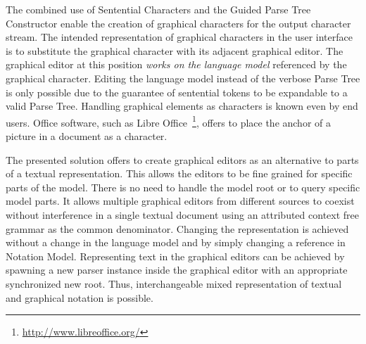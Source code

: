 The combined use of Sentential Characters and the Guided Parse Tree Constructor enable the creation of graphical characters for the output character stream. The intended representation of graphical characters in the user interface is to substitute the graphical character with its adjacent graphical editor. The graphical editor at this position \emph{works on the language model} referenced by the graphical character. Editing the language model instead of the verbose Parse Tree is only possible due to the guarantee of sentential tokens to be expandable to a valid Parse Tree. Handling graphical elements as characters is known even by end users. Office software, such as Libre Office~\footnote{\raggedright \url{http://www.libreoffice.org/}}, offers to place the anchor of a picture in a document as a character.

The presented solution offers to create graphical editors as an alternative to parts of a textual representation. This allows the editors to be fine grained for specific parts of the model. There is no need to handle the model root or to query specific model parts. It allows multiple graphical editors from different sources to coexist without interference in a single textual document using an attributed context free grammar as the common denominator. Changing the representation is achieved without a change in the language model and by simply changing a reference in Notation Model. Representing text in the graphical editors can be achieved by spawning a new parser instance inside the graphical editor with an appropriate synchronized new root. Thus, interchangeable mixed representation of textual and graphical notation is possible.




